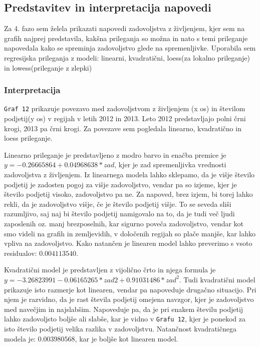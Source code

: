 \documentclass[11pt,a4paper]{article}
\begin{document}
\subsection{Predstavitev in interpretacija napovedi}
Za 4. fazo sem želela prikazati napovedi zadovoljstva z življenjem, kjer sem na grafih najprej predstavila, kakšna prileganja so možna in nato s temi prileganje napovedala kako se spreminja zadovoljstvo glede na spremenljivke. Uporabila sem regresijska prileganja z modeli: linearni, kvadratični, loess(za lokalno prileganje) in lowess(prileganje z zlepki)

\subsubsection{Interpretacija}
\par \verb+Graf 12+ prikazuje povezavo med zadovoljstvom z življenjem (x os)  in številom podjetij(y os) v regijah v letih 2012 in 2013. Leto 2012 predstavljajo polni črni krogi, 2013 pa črni krogi. Za povezave sem pogledala linearno, kvadratično in loess prileganje.
\par Linearno prileganje je predstavljeno z modro barvo in enačba premice je $y= -0.26665864 + 0.04968638 * zad$, kjer je zad spremenljivka vrednosti zadovoljstva z življenjem. Iz linearnega modela lahko sklepamo, da je višje število podjetij je zadosten pogoj za višje zadovoljstvo, vendar pa so izjeme, kjer je število podjetij visoko, zadovoljstvo pa ne. Za napoved, brez izjem, bi torej lahko rekli, da je zadovoljstvo višje, če je število podjetij višje. To se seveda sliši razumljivo, saj naj bi število podjetij namigovalo na to, da je tudi več ljudi zaposlenih oz. manj brezposelnih, kar sigurno poveča zadovoljstvo, vendar kot smo videli na grafih in zemljevidih, v določenih regijah so plače manjše, kar lahko vpliva na zadovoljstvo. Kako natančen je linearen model lahko preverimo s vsoto residualov: $0.004113540$.

Kvadratični model je predstavljen z vijolično črto in njega formula je $y= -3.26823991 - 0.06165265 * zad2 + 0.91031486 *zad^2$. Tudi kvadratični model prikazuje isto razmerje kot linearen, vendar pa napoveduje drugačno situacijo. Pri njem je razvidno, da je rast števila podjetij omejena navzgor, kjer je zadovoljstvo med navečjim in najslabšim. Napoveduje pa, da je pri enakem številu podjetij lahko zadovoljsto boljše ali slabše, kar je vidno v \verb+Grafu 12+, kjer je ponekod za isto število podjetij velika razlika v zadovoljstvu. Natančnost kvadratičnega modela je: $0.003980568$, kar je boljše kot linearen model.
\end{document}
